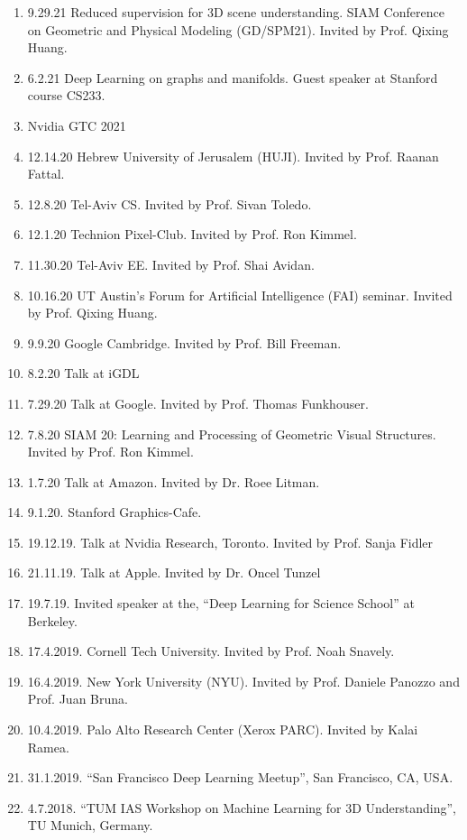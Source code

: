 \begin{enumerate}
    \item 9.29.21 Reduced supervision for 3D scene understanding. SIAM Conference on Geometric and Physical Modeling (GD/SPM21). Invited by Prof. Qixing Huang.
    \item 6.2.21 Deep Learning on graphs and manifolds. Guest speaker at Stanford course CS233.
    \item Nvidia GTC 2021
    \item 12.14.20 Hebrew University of Jerusalem (HUJI). Invited by Prof. Raanan Fattal. 
    \item 12.8.20 Tel-Aviv CS. Invited by Prof. Sivan Toledo.
    \item 12.1.20 Technion Pixel-Club. Invited by Prof. Ron Kimmel. 
    \item 11.30.20 Tel-Aviv EE. Invited by Prof. Shai Avidan.
    \item 10.16.20 UT Austin's Forum for Artificial Intelligence (FAI) seminar. Invited by Prof. Qixing Huang. 
    \item 9.9.20 Google Cambridge. Invited by Prof. Bill Freeman.
    \item 8.2.20 Talk at iGDL
    \item 7.29.20 Talk at Google. Invited by Prof. Thomas Funkhouser.
    \item 7.8.20 SIAM 20: Learning and Processing of Geometric Visual Structures. Invited by Prof. Ron Kimmel.
    \item 1.7.20 Talk at Amazon. Invited by Dr. Roee Litman.
    \item 9.1.20. Stanford Graphics-Cafe.
    \item 19.12.19. Talk at Nvidia Research, Toronto. Invited by Prof. Sanja Fidler
    \item 21.11.19. Talk at Apple. Invited by Dr. Oncel Tunzel
    \item 19.7.19. Invited speaker at the, ``Deep Learning for Science School'' at Berkeley.
    \item 17.4.2019. Cornell Tech University. Invited by Prof. Noah Snavely.
    \item 16.4.2019. New York University (NYU). Invited by Prof. Daniele Panozzo and Prof. Juan Bruna.
    \item 10.4.2019. Palo Alto Research Center (Xerox PARC). Invited by Kalai Ramea.
    \item 31.1.2019. ``San Francisco Deep Learning Meetup'', San Francisco, CA, USA.
    \item 4.7.2018. ``TUM IAS Workshop on Machine Learning for 3D Understanding'', TU Munich, Germany.

\end{enumerate}
